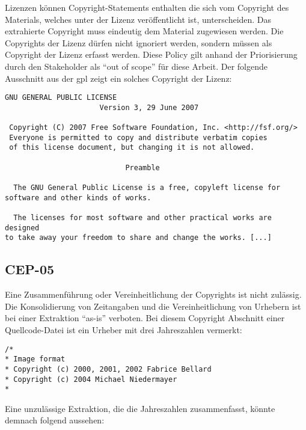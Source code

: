 Lizenzen können Copyright-Statements enthalten die sich vom Copyright des Materials, welches unter der Lizenz veröffentlicht ist, unterscheiden.
Das extrahierte Copyright muss eindeutig dem Material zugewiesen werden.
Die Copyrights der Lizenz dürfen nicht ignoriert werden, sondern müssen als Copyright der Lizenz erfasst werden.
Diese Policy gilt anhand der Priorisierung durch den Stakeholder als \enquote{out of scope} für diese Arbeit.
Der folgende Ausschnitt aus der \gls{gpl} zeigt ein solches Copyright der Lizenz:

\begin{lstlisting}[numbers=none, keepspaces=true]
                    GNU GENERAL PUBLIC LICENSE
                      Version 3, 29 June 2007

 Copyright (C) 2007 Free Software Foundation, Inc. <http://fsf.org/>
 Everyone is permitted to copy and distribute verbatim copies
 of this license document, but changing it is not allowed.

                            Preamble

  The GNU General Public License is a free, copyleft license for
software and other kinds of works.

  The licenses for most software and other practical works are designed
to take away your freedom to share and change the works. [...]
\end{lstlisting}


\subsection{CEP-05}\label{subsec:cep-05}

Eine Zusammenführung oder Vereinheitlichung der Copyrights ist nicht zulässig.
Die Konsolidierung von Zeitangaben und die Vereinheitlichung von Urhebern ist bei einer Extraktion \enquote{as-is} verboten.
Bei diesem Copyright Abschnitt einer Quellcode-Datei ist ein Urheber mit drei Jahreszahlen vermerkt:

\begin{lstlisting}[numbers=none, keepspaces=true]
/*
* Image format
* Copyright (c) 2000, 2001, 2002 Fabrice Bellard
* Copyright (c) 2004 Michael Niedermayer
*
\end{lstlisting}

Eine unzulässige Extraktion, die die Jahreszahlen zusammenfasst, könnte demnach folgend aussehen:

